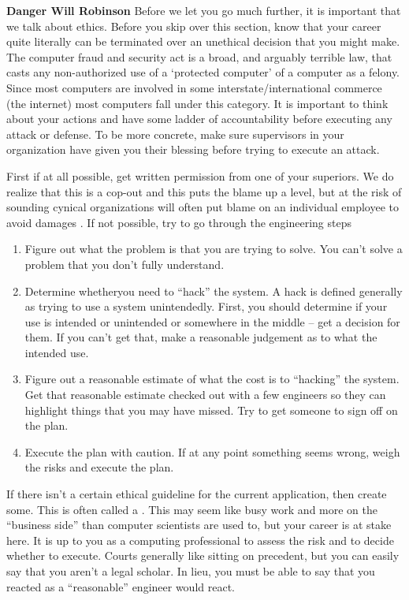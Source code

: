 \textbf{Danger Will Robinson} Before we let you go much further, it is important that we talk about ethics.
Before you skip over this section, know that your career quite literally can be terminated over an unethical decision that you might make.
The computer fraud and security act is a broad, and arguably terrible law, that casts any non-authorized use of a `protected computer' of a computer as a felony.
Since most computers are involved in some interstate/international commerce (the internet) most computers fall under this category.
It is important to think about your actions and have some ladder of accountability before executing any attack or defense.
To be more concrete, make sure supervisors in your organization have given you their blessing before trying to execute an attack.

First if at all possible, get written permission from one of your superiors.
We do realize that this is a cop-out and this puts the blame up a level, but at the risk of sounding cynical organizations will often put blame on an individual employee to avoid damages .
If not possible, try to go through the engineering steps

\begin{enumerate}
\item Figure out what the problem is that you are trying to solve.
  You can't solve a problem that you don't fully understand.
\item Determine whetheryou need to ``hack'' the system.
  A hack is defined generally as trying to use a system unintendedly.
  First, you should determine if your use is intended or unintended or somewhere in the middle -- get a decision for them.
  If you can't get that, make a reasonable judgement as to what the intended use.
\item Figure out a reasonable estimate of what the cost is to ``hacking'' the system.
  Get that reasonable estimate checked out with a few engineers so they can highlight things that you may have missed.
  Try to get someone to sign off on the plan.
\item Execute the plan with caution.
  If at any point something seems wrong, weigh the risks and execute the plan.
\end{enumerate}

If there isn't a certain ethical guideline for the current application, then create some.
This is often called a .
This may seem like busy work and more on the ``business side'' than computer scientists are used to, but your career is at stake here.
It is up to you as a computing professional to assess the risk and to decide whether to execute.
Courts generally like sitting on precedent, but you can easily say that you aren't a legal scholar.
In lieu, you must be able to say that you reacted as a ``reasonable'' engineer would react.

